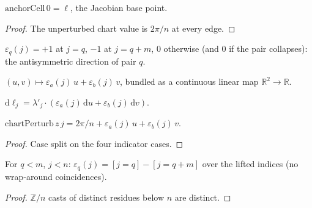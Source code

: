 \begin{lemma}
  \label{lem:anchor_cell_zero}
  $\mathrm{anchorCell}\,0 = \ell$, the Jacobian base point.
\end{lemma}
\begin{proof}

\leanok
  The unperturbed chart value is $2\pi/n$ at every edge.
\end{proof}

\begin{definition}
  \label{def:pair_sign}
  $\varepsilon_q(j) = +1$ at $j = q$, $-1$ at $j = q + m$, $0$ otherwise (and
  $0$ if the pair collapses): the antisymmetric direction of pair $q$.
\end{definition}

\begin{definition}
  \label{def:pair_clm}
  $(u,v) \mapsto \varepsilon_a(j)\,u + \varepsilon_b(j)\,v$, bundled as a
  continuous linear map $\mathbb{R}^2 \to \mathbb{R}$.
\end{definition}

\begin{definition}
  \label{def:anchor_cell_deriv}
  $\mathrm{d}\ell_j = \lambda'_j \cdot (\varepsilon_a(j)\,\mathrm{d}u +
  \varepsilon_b(j)\,\mathrm{d}v)$.
\end{definition}

\begin{lemma}
  \label{lem:chart_perturb_eq_affine}
  $\mathrm{chartPerturb}\,z\,j = 2\pi/n + \varepsilon_a(j)\,u +
  \varepsilon_b(j)\,v$.
\end{lemma}
\begin{proof}

\leanok
  Case split on the four indicator cases.
\end{proof}

\begin{lemma}
  \label{lem:pair_sign_nat_cast}
  For $q < m$, $j < n$: $\varepsilon_q(j) = [j = q] - [j = q + m]$ over the
  lifted indices (no wrap-around coincidences).
\end{lemma}
\begin{proof}

\leanok
  $\mathbb{Z}/n$ casts of distinct residues below $n$ are distinct.
\end{proof}

